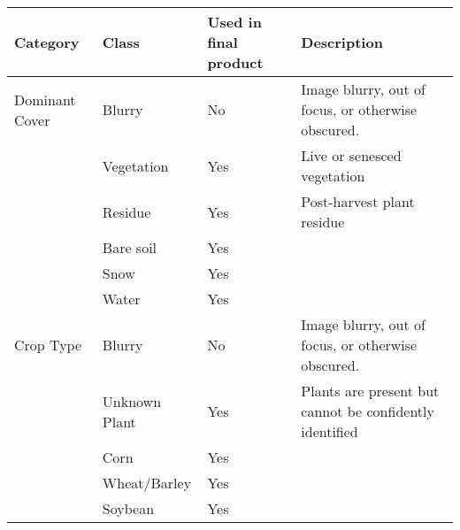 \documentclass{article}
\begin{document}
\begin{table}[]
\begin{tabular}{|p{2cm}|p{3cm}|p{2cm}|p{6cm}|}
\hline
Category       & Class              & Used in final product & Description                                                                                          \\ \hline
Dominant Cover & Blurry             & No                    & Image blurry, out of focus, or otherwise obscured.                                                   \\ \hline
               & Vegetation         & Yes                   & Live or senesced vegetation                                                                          \\ \hline
               & Residue            & Yes                   & Post-harvest plant residue                                                                           \\ \hline
               & Bare soil          & Yes                   &                                                                                                      \\ \hline
               & Snow               & Yes                   &                                                                                                      \\ \hline
               & Water              & Yes                   &                                                                                                      \\ \hline
Crop Type      & Blurry             & No                    & Image blurry, out of focus, or otherwise obscured.                                                   \\ \hline
               & Unknown Plant      & Yes                   & Plants are present but cannot be confidently identified                                              \\ \hline
               & Corn               & Yes                   &                                                                                                      \\ \hline
               & Wheat/Barley       & Yes                   &                                                                                                      \\ \hline
               & Soybean            & Yes                   &                                                                                                      \\ \hline

\end{tabular}
\end{table}
\end{document}
